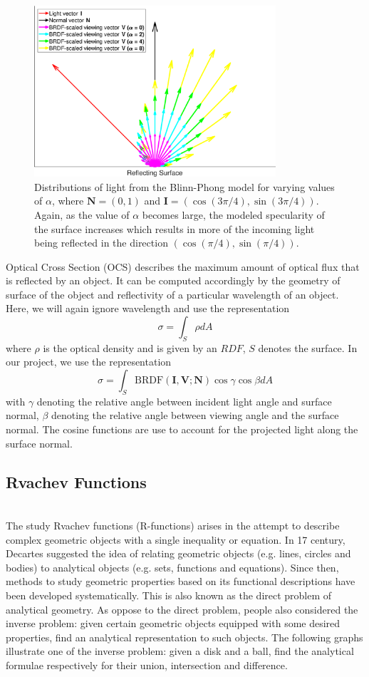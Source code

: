 \documentclass[11pt]{amsart}
\newcommand{\BRDF}{\mathrm{BRDF}}
\theoremstyle{definition}
\begin{document}
\begin{figure}[H]
 \includegraphics[width=0.8\textwidth]{./figs/BRDF_Vectors.eps}
 \caption{Distributions of light from the Blinn-Phong model for varying values of $\alpha$, where $\mathbf{N} = (0,1)$ and $\mathbf{I} = (\cos(3\pi/4),\sin(3\pi/4))$. Again, as the value of $\alpha$ becomes large, the modeled specularity of the surface increases which results in more of the incoming light being reflected in the direction $(\cos(\pi/4),\sin(\pi/4))$.}
 \label{BRDFVectors}
\end{figure}

Optical Cross Section (OCS) describes the maximum amount of optical flux that is reflected by an object. It can be computed accordingly by the geometry of surface of the object and reflectivity of a particular wavelength of an object. Here, we will again ignore wavelength and use the representation 
$$\sigma=\int_{S} \rho dA$$
where $\rho$ is the optical density and is given by an $RDF$, $S$ denotes the surface. In our project, we use the representation
$$\sigma= \int_S\BRDF(\mathbf{I},\mathbf{V};\mathbf{N}) \cos\gamma\cos\beta dA$$
with $\gamma$ denoting the relative angle between incident light angle and surface normal, $\beta$ denoting the relative angle between viewing angle and the surface normal. The cosine functions are use to account for the projected light along the surface normal. 

\subsection{Rvachev Functions}~\\
The study Rvachev functions (R-functions) arises in the attempt
to describe complex geometric objects with a single inequality or equation. In
17 century, Decartes suggested the idea of relating geometric objects (e.g.
lines, circles and bodies) to analytical objects (e.g. sets, functions and
equations). Since then, methods to study geometric properties based on its
functional descriptions have been developed systematically. This is also known
as the direct problem of analytical geometry. As oppose to the direct problem,
people also considered the inverse problem: given certain geometric objects
equipped with some desired properties, find an analytical representation to
such objects. The following graphs illustrate one of the inverse problem: given a disk and a ball, find the analytical formulae respectively for their union, intersection and difference. 
\end{document}
